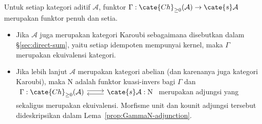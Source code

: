 
\hypertarget{o014.aljabr2.chapter8.dold-kan-b}{ }
\begin{theorem}\label{prop:Dold-Kan}
	Untuk setiap kategori aditif $\mathcal{A}$, funktor
	$\Gamma:\cate{Ch}_{\geq0}(\mathcal{A})\to\cate{s}\mathcal{A}$ merupakan
	funktor penuh dan setia.
	\begin{itemize}
		\item Jika $\mathcal{A}$ juga merupakan kategori Karoubi sebagaimana
		disebutkan dalam \S\ref{sec:direct-sum}, yaitu setiap idempoten mempunyai
		kernel, maka $\Gamma$ merupakan ekuivalensi kategori.
		\item Jika lebih lanjut $\mathcal{A}$ merupakan kategori abelian (dan
		karenanya juga kategori Karoubi), maka $\mathrm{N}$ adalah funktor
		kuasi-invers bagi $\Gamma$ dan
		$\begin{tikzcd}
			\Gamma: \cate{Ch}_{\geq 0}(\mathcal{A}) \arrow[shift left, r] & \cate{s}\mathcal{A} : \mathrm{N} \arrow[shift left, l]
		\end{tikzcd}$
		merupakan adjungsi yang sekaligus merupakan ekuivalensi. Morfisme unit dan kounit adjungsi
		tersebut dideskripsikan dalam Lema~\ref{prop:GammaN-adjunction}.
	\end{itemize}
\end{theorem}
